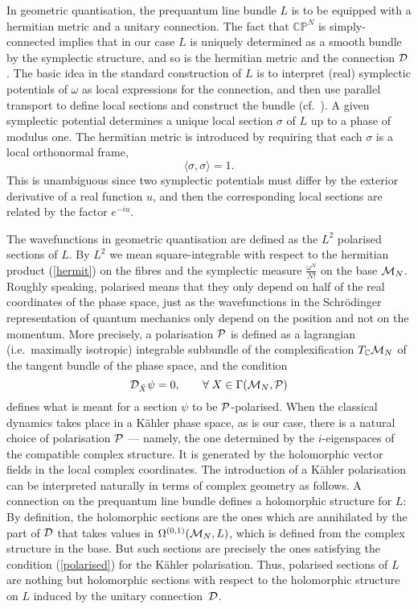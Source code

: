 \documentclass[a4paper,11pt]{article}
\begin{document}
In geometric quantisation, the prequantum line bundle $L$ is to be
equipped with a hermitian metric and a unitary connection. The
fact that $\mathbb{CP}^{N}$ is simply-connected implies that in our
case $L$ is uniquely determined as a smooth bundle by the symplectic
structure, and so is the
hermitian metric and the connection ${\cal D}$. The basic idea in
the standard construction of $L$ is to interpret (real) symplectic 
potentials of $\omega$ as local expressions for the connection, and then use 
parallel transport to define local sections and construct the 
bundle (cf.~\cite{Woo}). 
A given symplectic potential determines a unique local section 
$\sigma$ of $L$ up to a phase of modulus one.
The hermitian metric is introduced by requiring that each $\sigma$ is
a local orthonormal frame,
\begin{equation}\label{hermit}
\langle \sigma,\sigma \rangle =1.
\end{equation}
This is unambiguous since two symplectic potentials must differ by the
exterior derivative of a real function $u$, and then the corresponding 
local sections are related by the factor $e^{-iu}$.


The wavefunctions in geometric quantisation are defined as the
$L^{2}$ polarised sections of $L$. By $L^{2}$ we mean
square-integrable with respect to the hermitian product (\ref{hermit})
on the fibres and the symplectic measure $\frac{\omega^{N}}{N!}$ 
on the base ${\cal M}_{N}$.
Roughly speaking, polarised means that they only depend on half of
the real coordinates of the phase space, just as the wavefunctions in
the Schr\"odinger representation of quantum mechanics only depend on
the position and not on the momentum. More precisely, a polarisation 
${\cal P}$ is defined as a lagrangian (i.e.~maximally isotropic)
integrable subbundle of the complexification $T_{\mathbb{C}}{\cal M}_{N}$
of the tangent bundle of the phase space, 
and the condition
\begin{equation}\label{polarised}
{\cal D}_{\bar{X}}\psi=0,\;\;\;\;\;\;\;
\forall \;X\in \Gamma({\cal M}_{N},{\cal P})
\end{equation}
defines what is meant for a section $\psi$ to be 
${\cal P}$-polarised. 
When the classical dynamics takes place in a K\"ahler phase space, as
is our case, there is a natural choice of polarisation ${\cal P}$ --- 
namely, the
one determined by the $i$-eigenspaces of the compatible complex 
structure. It is generated by the holomorphic vector fields
in the local complex coordinates.
The introduction of a K\"ahler polarisation can be interpreted 
naturally in terms of complex geometry as
follows. A connection on the prequantum line bundle defines a
holomorphic structure for $L$: By definition, the holomorphic sections
are the ones which are annihilated by the part of ${\cal D}$ that
takes values in $\Omega^{(0,1)}({\cal M}_{N},L)$, which is defined
from the complex structure in the base. But such sections are
precisely the ones satisfying the condition (\ref{polarised}) for the
K\"ahler polarisation.
Thus, polarised sections of $L$ are nothing but holomorphic sections
with respect to the holomorphic structure on $L$ induced by the
unitary connection~${\cal D}$.
\end{document}
